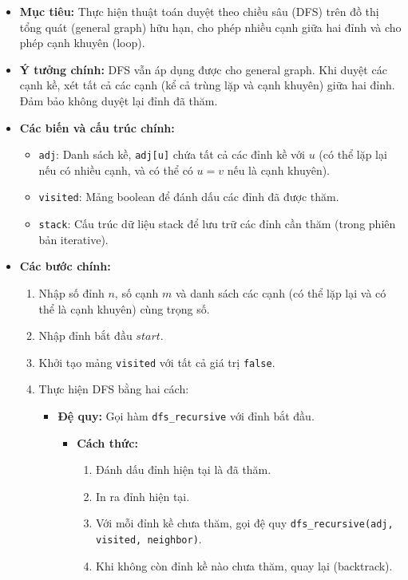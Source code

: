 \documentclass{article}
\begin{document}
\begin{itemize}
    \item \textbf{Mục tiêu:} Thực hiện thuật toán duyệt theo chiều sâu (DFS) trên đồ thị tổng quát (general graph) hữu hạn, cho phép nhiều cạnh giữa hai đỉnh và cho phép cạnh khuyên (loop).
    \item \textbf{Ý tưởng chính:} DFS vẫn áp dụng được cho general graph. Khi duyệt các cạnh kề, xét tất cả các cạnh (kể cả trùng lặp và cạnh khuyên) giữa hai đỉnh. Đảm bảo không duyệt lại đỉnh đã thăm.
    \item \textbf{Các biến và cấu trúc chính:}
    \begin{itemize}
        \item \texttt{adj}: Danh sách kề, \texttt{adj[u]} chứa tất cả các đỉnh kề với $u$ (có thể lặp lại nếu có nhiều cạnh, và có thể có $u = v$ nếu là cạnh khuyên).
        \item \texttt{visited}: Mảng boolean để đánh dấu các đỉnh đã được thăm.
        \item \texttt{stack}: Cấu trúc dữ liệu stack để lưu trữ các đỉnh cần thăm (trong phiên bản iterative).
    \end{itemize}
    \item \textbf{Các bước chính:}
    \begin{enumerate}
        \item Nhập số đỉnh $n$, số cạnh $m$ và danh sách các cạnh (có thể lặp lại và có thể là cạnh khuyên) cùng trọng số.
        \item Nhập đỉnh bắt đầu $start$.
        \item Khởi tạo mảng \texttt{visited} với tất cả giá trị \texttt{false}.
        \item Thực hiện DFS bằng hai cách:
        \begin{itemize}
            \item \textbf{Đệ quy:} Gọi hàm \texttt{dfs\_recursive} với đỉnh bắt đầu.
            \begin{itemize}
                \item \textbf{Cách thức:} 
                \begin{enumerate}
                    \item Đánh dấu đỉnh hiện tại là đã thăm.
                    \item In ra đỉnh hiện tại.
                    \item Với mỗi đỉnh kề chưa thăm, gọi đệ quy \texttt{dfs\_recursive(adj, visited, neighbor)}.
                    \item Khi không còn đỉnh kề nào chưa thăm, quay lại (backtrack).

\end{enumerate}
\end{itemize}
\end{itemize}
\end{enumerate}
\end{itemize}
\end{document}
